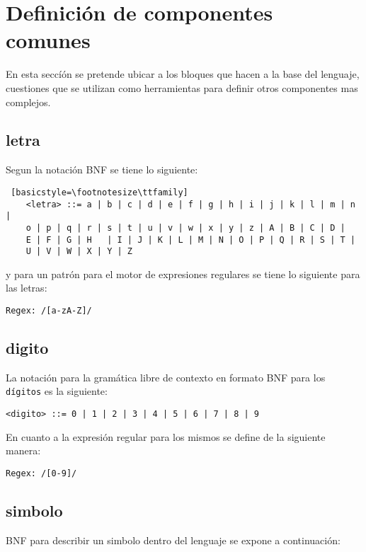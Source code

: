 \section{Definición de componentes comunes}
\label{sub:componentes_comunes}

En esta seccíón se pretende ubicar a los bloques que hacen a la base del
lenguaje, cuestiones que se utilizan como herramientas para definir otros
componentes mas complejos.

\subsection{letra}
\label{sub:letra}

Segun la notación BNF se tiene lo siguiente:

\begin{lstlisting} [basicstyle=\footnotesize\ttfamily]
	<letra> ::= a | b | c | d | e | f | g | h | i | j | k | l | m | n |
	o | p | q | r | s | t | u | v | w | x | y | z | A | B | C | D |
	E | F | G | H	| I | J | K | L | M | N | O | P | Q | R | S | T |
	U | V | W | X | Y | Z
\end{lstlisting}


y para un patrón para el motor de expresiones regulares se tiene lo
siguiente para las letras:

\begin{lstlisting}[basicstyle=\footnotesize\ttfamily]
Regex: /[a-zA-Z]/
\end{lstlisting}

\subsection{digito}
\label{sub:digito}
La notación para la gramática libre de contexto en formato BNF para los
\texttt{dígitos} es la siguiente:

\begin{lstlisting}[basicstyle=\footnotesize\ttfamily]
  <digito> ::= 0 | 1 | 2 | 3 | 4 | 5 | 6 | 7 | 8 | 9
\end{lstlisting}

En cuanto a la expresión regular para los mismos se define de la siguiente
manera:

\begin{lstlisting}[basicstyle=\footnotesize\ttfamily]
	Regex: /[0-9]/
\end{lstlisting}

\subsection{simbolo}
\label{sub:simbolo}
BNF para describir un simbolo dentro del lenguaje se expone a continuación:

